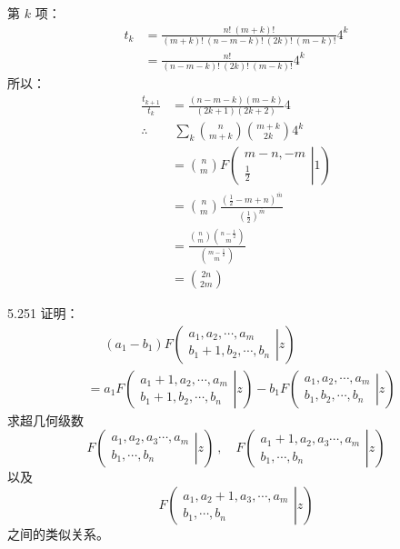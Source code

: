 第 \( k \) 项：
\begin{align*}
  t_k &= \frac{n! \ (m+k)!}{(m+k)! \ (n-m-k)! \ (2k)! \ (m-k)!} 4^k \\
  &= \frac{n!}{(n-m-k)! \ (2k)! \ (m-k)!} 4^k
\end{align*}
所以：
\begin{align*}
  \frac{t_{k+1}}{t_k} &= \frac{(n-m-k) (m-k)}{(2k+1) (2k+2)} 4 \\[6pt]
  \therefore & \ \sum_k \binom{n}{m+k} \binom{m+k}{2k} 4^k \\
  &= \binom{n}{m} F
  \left( \left.
    \begin{array}{cccc}
      m-n, -m \\
      \frac{1}{2}
  \end{array} \right|{1} \right) \\
  &= \binom{n}{m} \frac{(\frac{1}{2} - m + n)^{\overline{m}}}{(\frac{1}{2})^{\overline{m}}} \\
  &= \frac{\binom{n}{m} \binom{n-\frac{1}{2}}{m}}{\binom{m-\frac{1}{2}}{m}} \\
  &= \binom{2n}{2m}
\end{align*}

\begin{problem}{5.25}{1}
  证明：
  \begin{align*}
    &\phantom{=} (a_1 - b_1) F
    \left( \left.
      \begin{array}{cccc}
        a_1, a_2, \cdots, a_m \\
        b_1+1, b_2, \cdots, b_n
    \end{array} \right|{z} \right) \\
    &=
    a_1 F
    \left( \left.
      \begin{array}{cccc}
        a_1+1, a_2, \cdots, a_m \\
        b_1+1, b_2, \cdots, b_n
    \end{array} \right|{z} \right)
    - b_1 F
    \left( \left.
      \begin{array}{cccc}
        a_1, a_2, \cdots, a_m \\
        b_1, b_2, \cdots, b_n
    \end{array} \right|{z} \right)
  \end{align*}
  求超几何级数
  \[
    F
    \left( \left.
      \begin{array}{cccc}
        a_1, a_2, a_3 \cdots, a_m \\
        b_1, \cdots, b_n
    \end{array} \right|{z} \right) \ , \quad
    F
    \left( \left.
      \begin{array}{cccc}
        a_1+1, a_2, a_3 \cdots, a_m \\
        b_1, \cdots, b_n
    \end{array} \right|{z} \right)
  \]
  以及
  \[
    F
    \left( \left.
      \begin{array}{cccc}
        a_1, a_2+1, a_3, \cdots, a_m \\
        b_1, \cdots, b_n
    \end{array} \right|{z} \right)
  \]
  之间的类似关系。
\end{problem}

